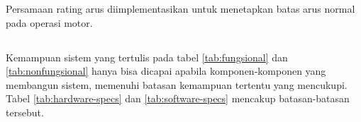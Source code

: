 \documentclass{elsinta}
\begin{document}
    Persamaan rating arus diimplementasikan untuk menetapkan 
    batas arus normal pada operasi motor.

\subsection{\HardwareSpecTitle}
Kemampuan sistem yang tertulis pada tabel
\ref{tab:fungsional} dan \ref{tab:nonfungsional}
hanya bisa dicapai apabila komponen-komponen
yang membangun sistem, memenuhi batasan
kemampuan tertentu yang mencukupi. Tabel
\ref{tab:hardware-specs} dan \ref{tab:software-specs}
mencakup batasan-batasan tersebut.
\end{document}
